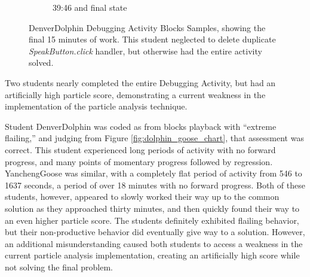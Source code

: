 \begin{figure}
\begin{subfigure}{.45\textwidth}
		\caption{39:46 and final state}
	\end{subfigure}

	\caption[DenverDolphin Debugging Activity Blocks Samples]{DenverDolphin Debugging Activity Blocks Samples, showing the final 15 minutes of work. This student neglected to delete duplicate \emph{SpeakButton.click} handler, but otherwise had the entire activity solved.}
	\label{fig:dolphin_blocks}
\end{figure}

Two students nearly completed the entire Debugging Activity, but had an artificially high particle score, demonstrating a current weakness in the implementation of the particle analysis technique. 

Student DenverDolphin was coded as from blocks playback with ``extreme flailing,'' and judging from Figure \ref{fig:dolphin_goose_chart}, that assessment was correct. This student experienced long periods of activity with no forward progress, and many points of momentary progress followed by regression. YanchengGoose was similar, with a completely flat period of activity from 546 to 1637 seconds, a period of over 18 minutes with no forward progress. Both of these students, however, appeared to slowly worked their way up to the common solution as they approached thirty minutes, and then quickly found their way to an even higher particle score. The students definitely exhibited flailing behavior, but their non-productive behavior did eventually give way to a solution. However, an additional misunderstanding caused both students to access a weakness in the current particle analysis implementation, creating an artificially high score while not solving the final problem.

